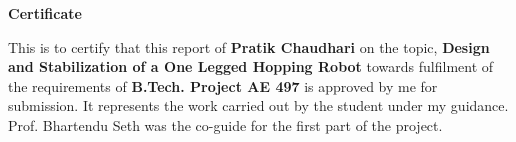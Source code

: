 \newpage
\vspace*{0.75in}
\label{pg:certi}
\begin{center}
{\bf \Huge Certificate}\\[0.5in]
\end{center}
{\normalsize This is to certify that this report of {\bf Pratik Chaudhari} on the topic, {\bf Design and
Stabilization of a One Legged Hopping Robot} towards fulfilment of the requirements of {\bf B.Tech.
Project AE 497} is approved by me for submission. It represents the work carried out by the student under my guidance. Prof. Bhartendu Seth was the co-guide for the first part of the project.}\\[1in]

\begin{center}
\\[0.1in]
\\[0.1in]
\raggedleft{\today}
\end{center}
